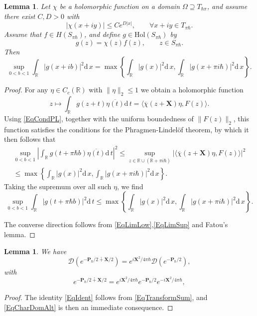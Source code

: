 \documentclass[11pt, reqno]{amsart}
\newtheorem{lemma}[theorem]{Lemma}
\theoremstyle{definition}
\numberwithin{equation}{section}
\def\msD{\mathscr D}
\def\R{\mathbb R}
\newcommand{\Pb}{\mathbf{P}}
\newcommand{\Xb}{\mathbf{X}}
\newcommand{\rd}{\mathrm{d}\!\,}
\newcommand{\Hol}{\mathrm{Hol}}
\begin{document}
\begin{lemma}\label{LemPL}
Let $\chi$ be a holomorphic function on a domain $\Omega \supseteq T_{\hbar\pi}$, and assume there exist $C,D>0$ with \begin{equation}\label{EqCondPL}
|\chi(x+iy)| \leq Ce^{D|x|},\qquad \forall x+iy \in T_{\pi \hbar}.
\end{equation}
Assume that $f \in H(S_{\pi\hbar})$, and define $g\in \Hol(S_{\pi\hbar})$ by 
\[
g(z) = \chi(z)f(z),\qquad z\in S_{\pi\hbar}.
\]
Then 
\begin{equation}\label{EqPL}
\sup_{0<b<1} \int_{\R} |g(x+ib)|^2\rd x = \max\left\{\int_{\R}|g(x)|^2\rd x, \int_{\R}|g(x+\pi i \hbar)|^2\rd x\right\}.
\end{equation}
\end{lemma}
\begin{proof}
For any $\eta\in C_c(\R)$ with $\|\eta\|_2\leq 1$ we obtain a holomorphic function 
\[
z \mapsto \int_{\R} g(z+t)\overline{\eta(t)}\rd t =  \langle \overline{\chi}(z+ \Xb)\eta,F(z)\rangle.
\]
Using \eqref{EqCondPL}, together with the uniform boundedness of $\|F(z)\|_2$, this function satisfies the conditions for the Phragmen-Lindel\"{o}f theorem, by which it then follows that 
\begin{multline*}
\sup_{0<b<1} \left|\int_{\R} g(t+\pi \hbar b) \overline{\eta(t)}\rd t \right|^2 \leq \sup_{z \in \R \cup (\R+\pi i \hbar)} |\langle \overline{\chi}(z+\Xb)\eta,F(z)\rangle|^2 \\ \leq \max\left\{\int_{\R}|g(x)|^2\rd x, \int_{\R}|g(x+\pi i \hbar)|^2\rd x\right\}.
\end{multline*}
Taking the supremum over all such $\eta$, we find 
\[
\sup_{0<b<1} \int_{\R} |g(t+\pi \hbar b)|^2\rd t  \leq \max\left\{\int_{\R}|g(x)|^2\rd x, \int_{\R}|g(x+\pi i \hbar)|^2\rd x\right\}.
\]

The converse direction follows from \eqref{EqLimLow},\eqref{EqLimSup} and Fatou's lemma.
\end{proof}

\begin{lemma}
We have 
\begin{equation}\label{EqCharDomAlt}
\msD(e^{-\Pb_{\hbar}/2\dotplus \Xb/2}) = e^{i\Xb^2/4\pi \hbar}\msD(e^{-\Pb_{\hbar}/2}),
\end{equation}
with 
\begin{equation}\label{EqIdent}
e^{-\Pb_{\hbar}/2\dotplus \Xb/2}= e^{i\Xb^2/4\pi \hbar} e^{-\Pb_{\hbar}/2} e^{-i\Xb^2/4\pi \hbar},
\end{equation}
\end{lemma}
\begin{proof}
The identity \eqref{EqIdent} follows from \eqref{EqTransformSum}, and  \eqref{EqCharDomAlt} is then an immediate consequence.
\end{proof}
\end{document}
